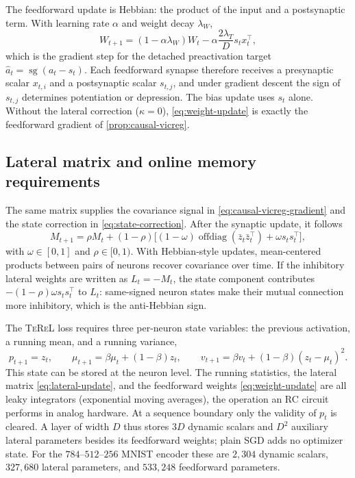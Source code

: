 \documentclass[11pt]{article}
\newcommand{\TeReL}{\textsc{TeReL}}
\newcommand{\stopgrad}{\operatorname{sg}}
\newcommand{\offdiag}{\operatorname{offdiag}}
\begin{document}
The feedforward update is Hebbian: the product of the input and a
postsynaptic term. With learning rate $\alpha$ and weight decay $\lambda_W$,
\begin{equation}
  W_{t+1}=(1-\alpha\lambda_W)W_t
  -\alpha\frac{2\lambda_T}{D}s_tx_t^\top,
  \label{eq:weight-update}
\end{equation}
which is the gradient step for the detached preactivation target
$\widehat a_t=\stopgrad(a_t-s_t)$. Each feedforward synapse therefore receives
a presynaptic scalar $x_{t,i}$ and a postsynaptic scalar $s_{t,j}$, and under
gradient descent the sign of $s_{t,j}$ determines potentiation or depression.
The bias update uses $s_t$ alone. Without the lateral correction
($\kappa=0$), \cref{eq:weight-update} is exactly the feedforward gradient of
\cref{prop:causal-vicreg}.

\subsection{Lateral matrix and online memory requirements}

The same matrix supplies the covariance signal in
\cref{eq:causal-vicreg-gradient} and the state correction in
\cref{eq:state-correction}. After the synaptic update, it follows
\begin{equation}
  M_{t+1}=\rho M_t+(1-\rho)\big[(1-\omega)\offdiag(\bar z_t\bar z_t^\top)
      +\omega s_ts_t^\top\big],
  \label{eq:lateral-update}
\end{equation}
with $\omega\in[0,1]$ and $\rho\in[0,1)$. With Hebbian-style updates,
mean-centered products between pairs of neurons recover covariance over time.
If the inhibitory lateral weights are written as $L_t=-M_t$, the state
component contributes $-(1-\rho)\omega s_ts_t^\top$ to $L_t$: same-signed
neuron states make their mutual connection more inhibitory, which is the
anti-Hebbian sign.

The \TeReL{} loss requires three per-neuron state variables: the previous
activation, a running mean, and a running variance,
\begin{equation}
  p_{t+1}=z_t,
  \qquad
  \mu_{t+1}=\beta\mu_t+(1-\beta)z_t,
  \qquad
  v_{t+1}=\beta v_t+(1-\beta)(z_t-\mu_t)^2.
  \label{eq:causal-state}
\end{equation}
This state can be stored at the neuron level. The running statistics, the
lateral matrix \cref{eq:lateral-update}, and the feedforward weights
\cref{eq:weight-update} are all leaky integrators (exponential moving
averages), the operation an RC circuit performs in analog hardware. At a
sequence boundary only the validity of $p_t$ is cleared.
A layer of width $D$ thus stores $3D$ dynamic scalars and $D^2$ auxiliary
lateral parameters besides its feedforward weights; plain SGD adds no
optimizer state. For the $784$--$512$--$256$ MNIST encoder these are $2{,}304$
dynamic scalars, $327{,}680$ lateral parameters, and $533{,}248$ feedforward
parameters.
\end{document}
